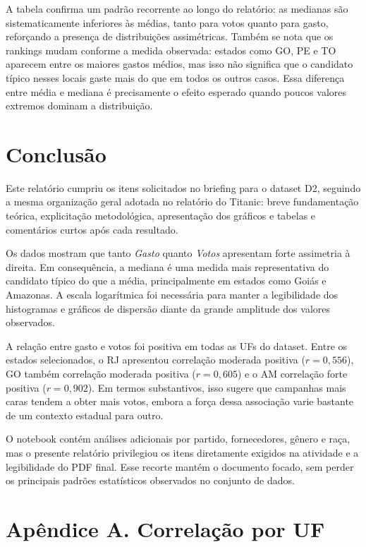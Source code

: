 \documentclass[conference]{IEEEtran}
\begin{document}
A tabela confirma um padrão recorrente ao longo do relatório: as medianas
são sistematicamente inferiores às médias, tanto para votos quanto para
gasto, reforçando a presença de distribuições assimétricas. Também se nota
que os rankings mudam conforme a medida observada: estados como GO, PE e TO
aparecem entre os maiores gastos médios, mas isso não significa que o
candidato típico nesses locais gaste mais do que em todos os outros casos.
Essa diferença entre média e mediana é precisamente o efeito esperado quando
poucos valores extremos dominam a distribuição.

\FloatBarrier

\section{Conclusão}

Este relatório cumpriu os itens solicitados no briefing para o dataset D2,
seguindo a mesma organização geral adotada no relatório do Titanic: breve
fundamentação teórica, explicitação metodológica, apresentação dos gráficos
e tabelas e comentários curtos após cada resultado.

Os dados mostram que tanto \textit{Gasto} quanto \textit{Votos} apresentam
forte assimetria à direita. Em consequência, a mediana é uma medida mais
representativa do candidato típico do que a média, principalmente em estados
como Goiás e Amazonas. A escala logarítmica foi necessária para manter a
legibilidade dos histogramas e gráficos de dispersão diante da grande
amplitude dos valores observados.

A relação entre gasto e votos foi positiva em todas as UFs do dataset.
Entre os estados selecionados, o RJ apresentou correlação moderada positiva
($r = 0{,}556$), GO também correlação moderada positiva ($r = 0{,}605$) e o
AM correlação forte positiva ($r = 0{,}902$). Em termos substantivos, isso
sugere que campanhas mais caras tendem a obter mais votos, embora a força
dessa associação varie bastante de um contexto estadual para outro.

O notebook contém análises adicionais por partido, fornecedores, gênero e
raça, mas o presente relatório privilegiou os itens diretamente exigidos na
atividade e a legibilidade do PDF final. Esse recorte mantém o documento
focado, sem perder os principais padrões estatísticos observados no conjunto
de dados.

\clearpage
\section*{Apêndice A. Correlação por UF}
\end{document}
